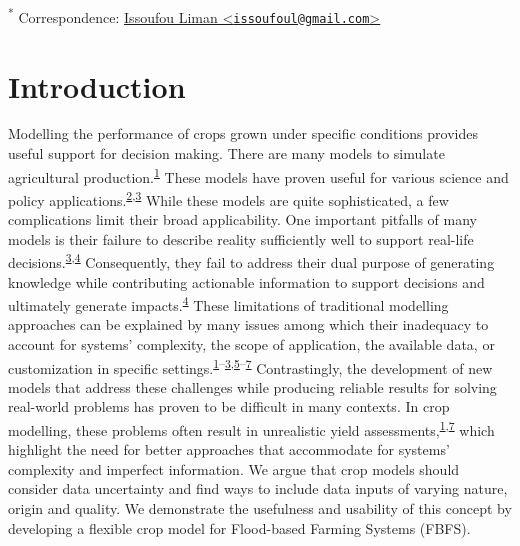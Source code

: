 \documentclass[12pt,oneside]{article}
\begin{document}
\textsuperscript{*} Correspondence: \href{mailto:issoufoul@gmail.com}{Issoufou Liman \textless{}\href{mailto:issoufoul@gmail.com}{\nolinkurl{issoufoul@gmail.com}}\textgreater{}}

\hypertarget{I}{%
\section{Introduction}\label{I}}

Modelling the performance of crops grown under specific conditions provides useful support for decision making. There are many models to simulate agricultural production.\textsuperscript{\protect\hyperlink{ref-Murthy_2004}{1}} These models have proven useful for various science and policy applications.\textsuperscript{\protect\hyperlink{ref-Boote_et_al_1996}{2},\protect\hyperlink{ref-Cerdan_et_al_2002}{3}} While these models are quite sophisticated, a few complications limit their broad applicability. One important pitfalls of many models is their failure to describe reality sufficiently well to support real-life decisions.\textsuperscript{\protect\hyperlink{ref-Cerdan_et_al_2002}{3},\protect\hyperlink{ref-Luedeling_et_al_2017}{4}} Consequently, they fail to address their dual purpose of generating knowledge while contributing actionable information to support decisions and ultimately generate impacts.\textsuperscript{\protect\hyperlink{ref-Luedeling_et_al_2017}{4}} These limitations of traditional modelling approaches can be explained by many issues among which their inadequacy to account for systems' complexity, the scope of application, the available data, or customization in specific settings.\textsuperscript{\protect\hyperlink{ref-Murthy_2004}{1}--\protect\hyperlink{ref-Cerdan_et_al_2002}{3},\protect\hyperlink{ref-Luedeling_and_Shepherd_2016}{5}--\protect\hyperlink{ref-VanIttersum_et_al_2013}{7}} Contrastingly, the development of new models that address these challenges while producing reliable results for solving real-world problems has proven to be difficult in many contexts. In crop modelling, these problems often result in unrealistic yield assessments,\textsuperscript{\protect\hyperlink{ref-Murthy_2004}{1},\protect\hyperlink{ref-VanIttersum_et_al_2013}{7}} which highlight the need for better approaches that accommodate for systems' complexity and imperfect information. We argue that crop models should consider data uncertainty and find ways to include data inputs of varying nature, origin and quality. We demonstrate the usefulness and usability of this concept by developing a flexible crop model for Flood-based Farming Systems (FBFS).
\end{document}
